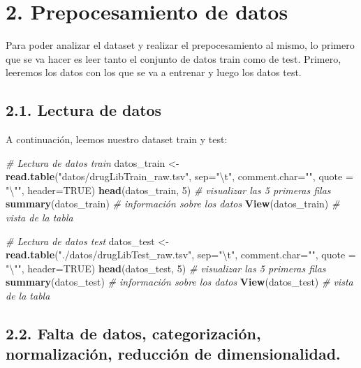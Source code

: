 \documentclass[spanish,]{article}
\newenvironment{Shaded}{\begin{snugshade}}{\end{snugshade}}
\newcommand{\CharTok}[1]{\textcolor[rgb]{0.31,0.60,0.02}{#1}}
\newcommand{\CommentTok}[1]{\textcolor[rgb]{0.56,0.35,0.01}{\textit{#1}}}
\newcommand{\DataTypeTok}[1]{\textcolor[rgb]{0.13,0.29,0.53}{#1}}
\newcommand{\DecValTok}[1]{\textcolor[rgb]{0.00,0.00,0.81}{#1}}
\newcommand{\KeywordTok}[1]{\textcolor[rgb]{0.13,0.29,0.53}{\textbf{#1}}}
\newcommand{\NormalTok}[1]{#1}
\newcommand{\OtherTok}[1]{\textcolor[rgb]{0.56,0.35,0.01}{#1}}
\newcommand{\StringTok}[1]{\textcolor[rgb]{0.31,0.60,0.02}{#1}}
\begin{document}
\hypertarget{prepocesamiento-de-datos}{%
\section{2. Prepocesamiento de datos}\label{prepocesamiento-de-datos}}

Para poder analizar el dataset y realizar el prepocesamiento al mismo,
lo primero que se va hacer es leer tanto el conjunto de datos train como
de test. Primero, leeremos los datos con los que se va a entrenar y
luego los datos test.

\hypertarget{lectura-de-datos}{%
\subsection{2.1. Lectura de datos}\label{lectura-de-datos}}

A continuación, leemos nuestro dataset train y test:

\begin{Shaded}
\begin{Highlighting}[]
\CommentTok{# Lectura de datos train}
\NormalTok{datos_train <-}\StringTok{ }\KeywordTok{read.table}\NormalTok{(}\StringTok{"datos/drugLibTrain_raw.tsv"}\NormalTok{, }\DataTypeTok{sep=}\StringTok{"}\CharTok{\textbackslash{}t}\StringTok{"}\NormalTok{, }\DataTypeTok{comment.char=}\StringTok{""}\NormalTok{,}
                          \DataTypeTok{quote =} \StringTok{"}\CharTok{\textbackslash{}"}\StringTok{"}\NormalTok{, }\DataTypeTok{header=}\OtherTok{TRUE}\NormalTok{)}
\KeywordTok{head}\NormalTok{(datos_train, }\DecValTok{5}\NormalTok{) }\CommentTok{# visualizar las 5 primeras filas}
\KeywordTok{summary}\NormalTok{(datos_train) }\CommentTok{# información sobre los datos}
\KeywordTok{View}\NormalTok{(datos_train)    }\CommentTok{# vista de la tabla}

\CommentTok{# Lectura de datos test}
\NormalTok{datos_test <-}\StringTok{ }\KeywordTok{read.table}\NormalTok{(}\StringTok{"./datos/drugLibTest_raw.tsv"}\NormalTok{, }\DataTypeTok{sep=}\StringTok{"}\CharTok{\textbackslash{}t}\StringTok{"}\NormalTok{, }\DataTypeTok{comment.char=}\StringTok{""}\NormalTok{,}
                         \DataTypeTok{quote =} \StringTok{"}\CharTok{\textbackslash{}"}\StringTok{"}\NormalTok{, }\DataTypeTok{header=}\OtherTok{TRUE}\NormalTok{)}
\KeywordTok{head}\NormalTok{(datos_test, }\DecValTok{5}\NormalTok{) }\CommentTok{# visualizar las 5 primeras filas}
\KeywordTok{summary}\NormalTok{(datos_test) }\CommentTok{# información sobre los datos}
\KeywordTok{View}\NormalTok{(datos_test)    }\CommentTok{# vista de la tabla}
\end{Highlighting}
\end{Shaded}

\hypertarget{falta-de-datos-categorizacion-normalizacion-reduccion-de-dimensionalidad.}{%
\subsection{2.2. Falta de datos, categorización, normalización,
reducción de
dimensionalidad.}\label{falta-de-datos-categorizacion-normalizacion-reduccion-de-dimensionalidad.}}
\end{document}
